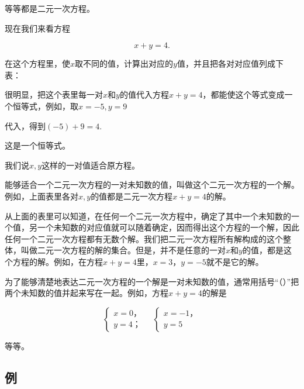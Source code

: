 等等都是二元一次方程。

现在我们来看方程

\[
x + y = 4.
\]

在这个方程里，使\(x\)取不同的值，计算出对应的\(y\)值，并且把各对对应值列成下表：

{\centering
\footnotesize\setlength{\tabcolsep}{2.6pt}%
\par
}

很明显，把这个表里每一对\(x\)和\(y\)的值代入方程\(x + y = 4\)，都能使这个等式变成一个恒等式，例如，取\(x = -5, y = 9\)

代入，得到\((-5)+9=4.\)

这是一个恒等式。

我们说\(x, y\)这样的一对值适合原方程。

能够适合一个二元一次方程的一对未知数的值，叫做这个二元一次方程的一个解。例如，上面表里各对\(x, y\)的值都是二元一次方程\(x + y = 4\)的解。

从上面的表里可以知道，在任何一个二元一次方程中，确定了其中一个未知数的一个值，另一个未知数的对应值就可以随着确定，因而得出这个方程的一个解，因此任何一个二元一次方程都有无数个解。我们把二元一次方程所有解构成的这个整体，叫做二元一次方程的解的集合。但是，并不是任意的一对\(x\)和\(y\)的值，都是这个方程的解。例如，在方程\(x + y = 4\)里，\(x = 3\)，\(y = -5\)就不是它的解。

为了能够清楚地表达二元一次方程的一个解是一对未知数的值，通常用括号``（）''把两个未知数的值并起来写在一起。例如，方程\(x + y = 4\)的解是

\[
\left\{ \begin{array}{l} x = 0\text{，} \\ y = 4\text{；} \end{array} \right. \quad \left\{ \begin{array}{l} x = - 1\text{，} \\ y = 5 \end{array} \right.
\]

等等。

\subsection{例}

